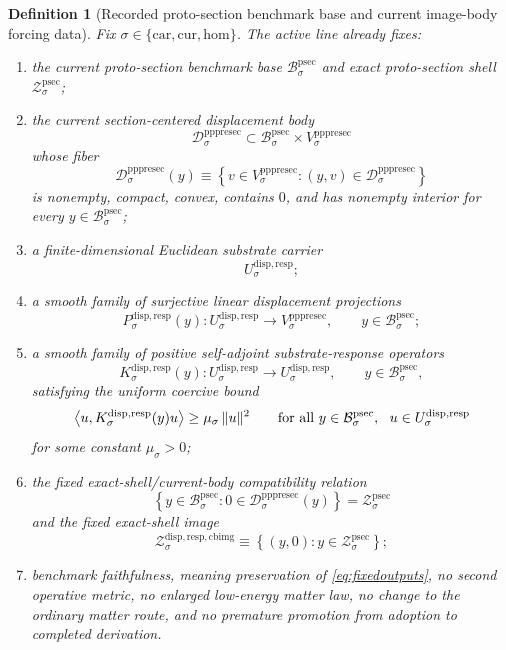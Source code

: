 \documentclass[11pt]{article}
\newcommand{\Car}{\mathrm{car}}
\newcommand{\Cur}{\mathrm{cur}}
\newcommand{\Hom}{\mathrm{hom}}
\newcommand{\ProtoSectionBody}[1]{\mathcal B_{#1}^{\mathrm{psec}}}
\newcommand{\ProtoSectionShell}[1]{\mathcal Z_{#1}^{\mathrm{psec}}}
\newcommand{\PrePreProtoSectionVertical}[1]{V_{#1}^{\mathrm{pppresec}}}
\newcommand{\PrePreProtoSectionResidualBody}[1]{\mathcal D_{#1}^{\mathrm{pppresec}}}
\newcommand{\SubstrateCarrier}[1]{U_{#1}^{\mathrm{disp,resp}}}
\newcommand{\SubstrateProjection}[1]{P_{#1}^{\mathrm{disp,resp}}}
\newcommand{\SubstrateOperator}[1]{K_{#1}^{\mathrm{disp,resp}}}
\newcommand{\CanonicalImageShell}[1]{\mathcal Z_{#1}^{\mathrm{disp,resp,cbimg}}}
\newtheorem{definition}{Definition}
\begin{document}
\begin{definition}[Recorded proto-section benchmark base and current image-body forcing data]
\label{def:route}
Fix \(\sigma\in\{\Car,\Cur,\Hom\}\). The active line already fixes:
\begin{enumerate}
    \item the current proto-section benchmark base \(\ProtoSectionBody{\sigma}\) and exact proto-section shell \(\ProtoSectionShell{\sigma}\);
    \item the current section-centered displacement body
    \[
    \PrePreProtoSectionResidualBody{\sigma}
    \subset
    \ProtoSectionBody{\sigma}\times\PrePreProtoSectionVertical{\sigma}
    \]
    whose fiber
    \[
    \PrePreProtoSectionResidualBody{\sigma}(y)
    \equiv
    \left\{
    v\in\PrePreProtoSectionVertical{\sigma}:(y,v)\in\PrePreProtoSectionResidualBody{\sigma}
    \right\}
    \]
    is nonempty, compact, convex, contains \(0\), and has nonempty interior for every \(y\in\ProtoSectionBody{\sigma}\);
    \item a finite-dimensional Euclidean substrate carrier
    \[
    \SubstrateCarrier{\sigma};
    \]
    \item a smooth family of surjective linear displacement projections
    \[
    \SubstrateProjection{\sigma}(y):
    \SubstrateCarrier{\sigma}\to\PrePreProtoSectionVertical{\sigma},
    \qquad
    y\in\ProtoSectionBody{\sigma};
    \]
    \item a smooth family of positive self-adjoint substrate-response operators
    \[
    \SubstrateOperator{\sigma}(y):
    \SubstrateCarrier{\sigma}\to\SubstrateCarrier{\sigma},
    \qquad
    y\in\ProtoSectionBody{\sigma},
    \]
    satisfying the uniform coercive bound
    \begin{equation}
    \ev{u,\SubstrateOperator{\sigma}(y)u}
    \ge
    \mu_{\sigma}\,\|u\|^2
    \qquad
    \text{for all }
    y\in\ProtoSectionBody{\sigma},
    \ \ u\in\SubstrateCarrier{\sigma}
    \label{eq:coercive}
    \end{equation}
    for some constant \(\mu_{\sigma}>0\);
    \item the fixed exact-shell/current-body compatibility relation
    \[
    \left\{
    y\in\ProtoSectionBody{\sigma}:0\in\PrePreProtoSectionResidualBody{\sigma}(y)
    \right\}
    =
    \ProtoSectionShell{\sigma}
    \]
    and the fixed exact-shell image
    \begin{equation}
    \CanonicalImageShell{\sigma}
    \equiv
    \left\{
    (y,0):y\in\ProtoSectionShell{\sigma}
    \right\};
    \label{eq:imageshell}
    \end{equation}
    \item benchmark faithfulness, meaning preservation of \eqref{eq:fixedoutputs}, no second operative metric, no enlarged low-energy matter law, no change to the ordinary matter route, and no premature promotion from adoption to completed derivation.
\end{enumerate}
\end{definition}
\end{document}
